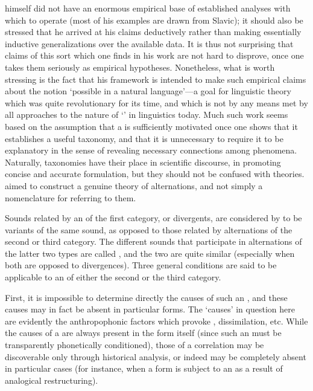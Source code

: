{\Kruszewski} himself did not have an enormous empirical base of
established analyses with which to operate (most of his examples are
drawn from Slavic); it should also be stressed that he arrived at his
claims deductively rather than making essentially inductive
generalizations over the available data. It is thus not surprising
that claims of this sort which one finds in his work are not hard to
disprove, once one takes them seriously as empirical
hypotheses. Nonetheless, what is worth stressing is the fact that his
framework is intended to make such empirical claims about the notion
`possible  in a natural language'—a goal for linguistic
theory which was quite revolutionary for its time, and which is not by
any means met by all approaches to the nature of `' in
linguistics today. Much such work seems based on the assumption that a
 is sufficiently motivated once one shows that it establishes
a useful taxonomy, and that it is unnecessary to require it to be
explanatory in the sense of revealing necessary connections among
phenomena. Naturally, taxonomies have their place in scientific
discourse, in promoting concise and accurate formulation, but they
should not be confused with theories. {\Kruszewski} aimed to construct a
genuine theory of alternations, and not simply a nomenclature for
referring to them.

Sounds related by an  of the first category, or divergents,
are considered by {\Kruszewski} to be variants of the same sound, as
opposed to those related by alternations of the second or third
category. The different sounds that participate in alternations of the
latter two types are called \emph{}, and the two are quite
similar (especially when both are opposed to divergences). Three
general conditions are said to be applicable to an  of
either the second or the third category.

First, it is impossible to determine directly the causes of such an
, and these causes may in fact be absent in particular
forms. The `causes' in question here are evidently the anthropophonic
factors which provoke , dissimilation, etc. While the
causes of a  are always present in the form itself (since
such an  must be transparently phonetically conditioned),
those of a correlation may be discoverable only through historical
analysis, or indeed may be completely absent in particular cases (for
instance, when a form is subject to an  as a result of
analogical restructuring).

